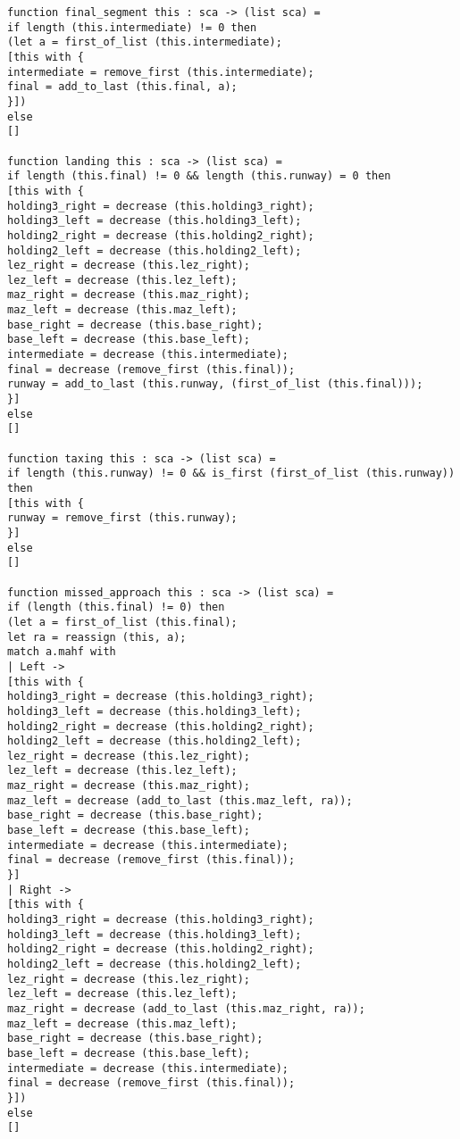 \begin{verbatim}
function final_segment this : sca -> (list sca) = 
if length (this.intermediate) != 0 then
(let a = first_of_list (this.intermediate);
[this with {
intermediate = remove_first (this.intermediate);
final = add_to_last (this.final, a);
}])
else 
[]

function landing this : sca -> (list sca) = 
if length (this.final) != 0 && length (this.runway) = 0 then
[this with {
holding3_right = decrease (this.holding3_right);
holding3_left = decrease (this.holding3_left);
holding2_right = decrease (this.holding2_right);
holding2_left = decrease (this.holding2_left);
lez_right = decrease (this.lez_right);
lez_left = decrease (this.lez_left);
maz_right = decrease (this.maz_right);
maz_left = decrease (this.maz_left);
base_right = decrease (this.base_right);
base_left = decrease (this.base_left);
intermediate = decrease (this.intermediate);
final = decrease (remove_first (this.final));
runway = add_to_last (this.runway, (first_of_list (this.final)));
}]
else
[]

function taxing this : sca -> (list sca) =
if length (this.runway) != 0 && is_first (first_of_list (this.runway)) then
[this with {
runway = remove_first (this.runway);
}]
else
[]

function missed_approach this : sca -> (list sca) =
if (length (this.final) != 0) then
(let a = first_of_list (this.final);
let ra = reassign (this, a);
match a.mahf with
| Left ->
[this with {
holding3_right = decrease (this.holding3_right);
holding3_left = decrease (this.holding3_left);
holding2_right = decrease (this.holding2_right);
holding2_left = decrease (this.holding2_left);
lez_right = decrease (this.lez_right);
lez_left = decrease (this.lez_left);
maz_right = decrease (this.maz_right);
maz_left = decrease (add_to_last (this.maz_left, ra));
base_right = decrease (this.base_right);
base_left = decrease (this.base_left);
intermediate = decrease (this.intermediate);
final = decrease (remove_first (this.final)); 
}]
| Right ->
[this with {
holding3_right = decrease (this.holding3_right);
holding3_left = decrease (this.holding3_left);
holding2_right = decrease (this.holding2_right);
holding2_left = decrease (this.holding2_left);
lez_right = decrease (this.lez_right);
lez_left = decrease (this.lez_left);
maz_right = decrease (add_to_last (this.maz_right, ra));
maz_left = decrease (this.maz_left);
base_right = decrease (this.base_right);
base_left = decrease (this.base_left);
intermediate = decrease (this.intermediate);
final = decrease (remove_first (this.final));
}])
else 
[]


\end{verbatim}
